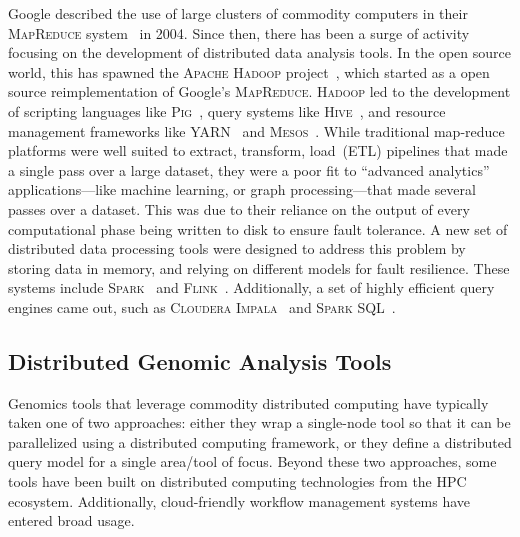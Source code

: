 \documentclass[phd]{ucbthesis}
\begin{document}
Google described the use of large clusters of commodity computers in their
\textsc{MapReduce} system~\cite{dean04, dean08} in 2004. Since then, there has
been a surge of activity focusing on the development of distributed data
analysis tools. In the open source world, this has spawned the \textsc{Apache
  Hadoop} project~\cite{hadoop}, which started as a open source reimplementation
of Google's \textsc{MapReduce}. \textsc{Hadoop} led to the development of
scripting languages like \textsc{Pig}~\cite{olston08}, query systems like
\textsc{Hive}~\cite{thusoo09}, and resource management frameworks like
\textsc{YARN}~\cite{vavilapalli13} and \textsc{Mesos}~\cite{hindman11}. While
traditional map-reduce platforms were well suited to extract, transform,
load~(ETL) pipelines that made a single pass over a large dataset, they were
a poor fit to ``advanced analytics'' applications---like machine learning, or
graph processing---that made several passes over a dataset. This was due to
their reliance on the output of every computational phase being written to
disk to ensure fault tolerance. A new set of distributed data processing tools
were designed to address this problem by storing data in memory, and relying
on different models for fault resilience. These systems include
\textsc{Spark}~\cite{zaharia10, zaharia12} and \textsc{Flink}~\cite{carbone15}.
Additionally, a set of highly efficient query engines came out, such as
\textsc{Cloudera Impala}~\cite{kornacker15} and \textsc{Spark
  SQL}~\cite{armbrust15}.

\subsection{Distributed Genomic Analysis Tools}
\label{sec:distributed-genome-analysis}

Genomics tools that leverage commodity distributed computing have typically
taken one of two approaches: either they wrap a single-node tool so that it can
be parallelized using a distributed computing framework, or they define a
distributed query model for a single area/tool of focus. Beyond these two
approaches, some tools have been built on distributed computing technologies
from the HPC ecosystem. Additionally, cloud-friendly workflow management
systems have entered broad usage.
\end{document}

